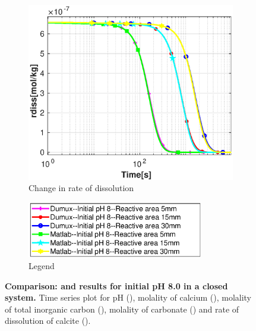 \begin{figure}
\begin{subfigure}{.5\linewidth}
    \end{subfigure}%
    \hfill
    \begin{subfigure}{.5\linewidth}
            \centering
        \includegraphics[width=\textwidth]{PICTURES/dvm_pH8_rdiss.eps}
        \caption{\small Change in rate of dissolution}
        \label{fig:dvmpH8rdiss}
    \end{subfigure}%
   \hfill
   \begin{subfigure}{.5\linewidth}
            \centering
        \includegraphics[width=0.85\textwidth]{PICTURES/dvm_pH8_legend.eps}
        \caption{\small Legend}
        \label{fig:dvmpH8legend}
    \end{subfigure}%
   \caption [Comparison: \DuMuX and \MATLAB results for initial pH 8.0 in a closed system.] {\textbf{Comparison: \DuMuX and \MATLAB results 
   for initial pH 8.0 in a closed system.} \small Time series plot for pH (), 
   molality of calcium (), molality of total inorganic carbon (), 
   molality of carbonate () and rate of dissolution of calcite ().} 
    \label{fig:comparisionDumuxMatlab_pH8.0}
\end{figure}
   
